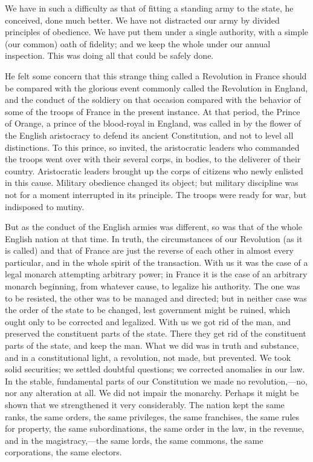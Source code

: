 We have in such a difficulty as that of fitting a standing army to the state, he conceived, done much better. We have not distracted our army by divided principles of obedience. We have put them under a single authority, with a simple (our common) oath of fidelity; and we keep the whole under our annual inspection. This was doing all that could be safely done.

He felt some concern that this strange thing called a Revolution in France should be compared with the glorious event commonly called the Revolution in England, and the conduct of the soldiery on that occasion compared with the behavior of some of the troops of France in the present instance. At that period, the Prince of Orange, a prince of the blood-royal in England, was called in by the flower of the English aristocracy to defend its ancient Constitution, and not to level all distinctions. To this prince, so invited, the aristocratic leaders who commanded the troops went over with their several corps, in bodies, to the deliverer of their country. Aristocratic leaders brought up the corps of citizens who newly enlisted in this cause. Military obedience changed its object; but military discipline was not for a moment interrupted in its principle. The troops were ready for war, but indisposed to mutiny.

But as the conduct of the English armies was different, so was that of the whole English nation at that time. In truth, the circumstances of our Revolution (as it is called) and that of France are just the reverse of each other in almost every particular, and in the whole spirit of the transaction. With us it was the case of a legal monarch attempting arbitrary power; in France it is the case of an arbitrary monarch beginning, from whatever cause, to legalize his authority. The one was to be resisted, the other was to be managed and directed; but in neither case was the order of the state to be changed, lest government might be ruined, which ought only to be corrected and legalized. With us we got rid of the man, and preserved the constituent parts of the state. There they get rid of the constituent parts of the state, and keep the man. What we did was in truth and substance, and in a constitutional light, a revolution, not made, but prevented. We took solid securities; we settled doubtful questions; we corrected anomalies in our law. In the stable, fundamental parts of our Constitution we made no revolution,—no, nor any alteration at all. We did not impair the monarchy. Perhaps it might be shown that we strengthened it very considerably. The nation kept the same ranks, the same orders, the same privileges, the same franchises, the same rules for property, the same subordinations, the same order in the law, in the revenue, and in the magistracy,—the same lords, the same commons, the same corporations, the same electors.

